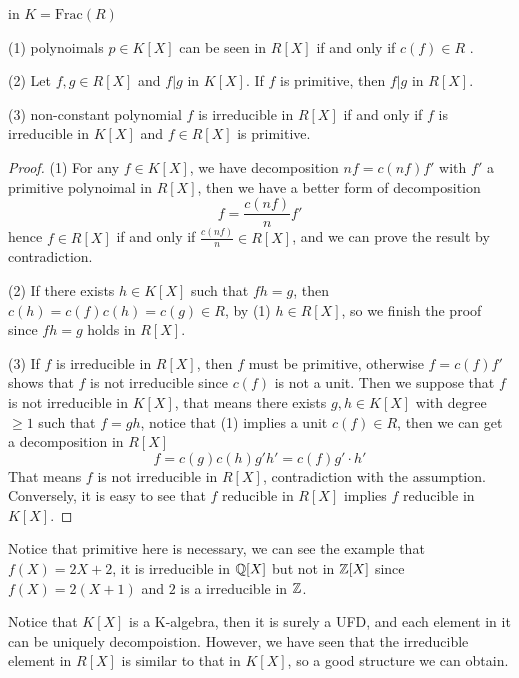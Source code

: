 \documentclass[en,geye,blue,normal,12pt]{elegantnote}
\begin{document}
\begin{proposition} \label{lemma primitive}
  in \(K = \text{Frac}(R)\)

  (1) polynoimals \(p \in K[X]\) can be seen in \(R[X]\) if and only if \(c(f) \in R\) .

  (2) Let \(f,g \in R[X]\) and \(f|g\) in \(K[X]\). If \(f\) is primitive, then \(f|g\) in \(R[X]\).

  (3) non-constant polynomial \(f\) is irreducible in \(R[X]\) if and only if \(f\) is irreducible in \(K[X]\) and \(f \in R[X]\) is primitive.

  \begin{proof}
    (1) For any \(f \in K[X]\), we have decomposition \(nf = c(nf)f'\) with \(f'\) a primitive polynoimal in \(R[X]\), then we have a better form of decomposition
    \[f = \frac{c(nf)}{n}f'\]
    hence \(f \in R[X]\) if and only if \(\frac{c(nf)}{n} \in R[X]\), and we can prove the result by contradiction.

    (2) If there exists \(h \in K[X]\) such that \(fh=g\), then \(c(h) = c(f)c(h) = c(g) \in R\), by (1) \(h \in R[X]\), so we finish the proof since \(fh=g\) holds in \(R[X]\).

    (3)  If \(f\) is irreducible in \(R[X]\), then \(f\) must be primitive, otherwise \(f = c(f)f'\) shows that \(f\) is not irreducible since \(c(f)\) is not a unit. Then we suppose that \(f\) is not irreducible in \(K[X]\), that means there exists \(g,h \in K[X]\) with degree \(\geq 1\) such that \(f=gh\), notice that (1) implies a unit \(c(f) \in R\), then we can get a decomposition in \(R[X]\)
    \[f = c(g)c(h) g'h' = c(f)g' \cdot h'\]
    That means \(f\) is not irreducible in \(R[X]\), contradiction with the assumption. Conversely, it is easy to see that \(f\) reducible in \(R[X]\) implies \(f\) reducible in \(K[X]\).
   \end{proof}
\end{proposition}
\begin{remark}
  Notice that primitive here is necessary, we can see the example that \(f(X) = 2X+2\), it is irreducible in \(\mathbb{Q}[X]\) but not in \(\mathbb{Z}[X]\) since \(f(X) = 2(X+1)\) and \(2\) is a irreducible in \(\mathbb{Z}\).
\end{remark}

Notice that \(K[X]\) is a K-algebra, then it is surely a UFD, and each element in it can be uniquely decompoistion. However, we have seen that the irreducible element in \(R[X]\) is similar to that in \(K[X]\), so a good structure we can obtain.
\end{document}
